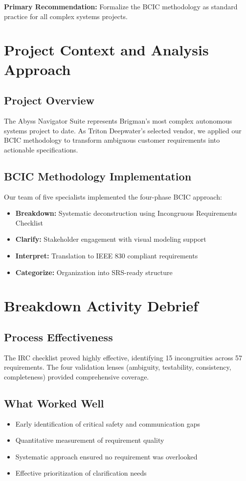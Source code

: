 \documentclass[12pt,a4paper]{article}
\begin{document}
\textbf{Primary Recommendation:} Formalize the BCIC methodology as standard practice for all complex systems projects.

\section{Project Context and Analysis Approach}

\subsection{Project Overview}
The Abyss Navigator Suite represents Brigman's most complex autonomous systems project to date. As Triton Deepwater's selected vendor, we applied our BCIC methodology to transform ambiguous customer requirements into actionable specifications.

\subsection{BCIC Methodology Implementation}
Our team of five specialists implemented the four-phase BCIC approach:
\begin{itemize}
    \item \textbf{Breakdown:} Systematic deconstruction using Incongruous Requirements Checklist
    \item \textbf{Clarify:} Stakeholder engagement with visual modeling support
    \item \textbf{Interpret:} Translation to IEEE 830 compliant requirements
    \item \textbf{Categorize:} Organization into SRS-ready structure
\end{itemize}

\section{Breakdown Activity Debrief}

\subsection{Process Effectiveness}
The IRC checklist proved highly effective, identifying 15 incongruities across 57 requirements. The four validation lenses (ambiguity, testability, consistency, completeness) provided comprehensive coverage.

\subsection{What Worked Well}
\begin{itemize}
    \item Early identification of critical safety and communication gaps
    \item Quantitative measurement of requirement quality
    \item Systematic approach ensured no requirement was overlooked
    \item Effective prioritization of clarification needs
\end{itemize}
\end{document}
